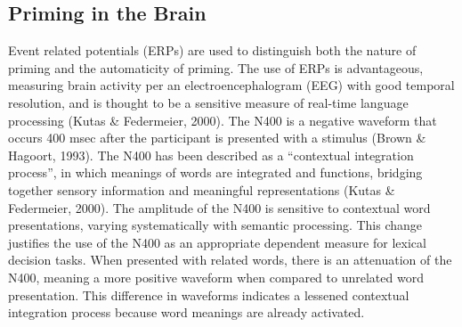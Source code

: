 \documentclass[english,man]{apa6}
\theoremstyle{definition}
\theoremstyle{definition}
\theoremstyle{definition}
\theoremstyle{remark}
\begin{document}
\subsection{Priming in the Brain}\label{priming-in-the-brain}

Event related potentials (ERPs) are used to distinguish both the nature
of priming and the automaticity of priming. The use of ERPs is
advantageous, measuring brain activity per an electroencephalogram (EEG)
with good temporal resolution, and is thought to be a sensitive measure
of real-time language processing (Kutas \& Federmeier, 2000). The N400
is a negative waveform that occurs 400 msec after the participant is
presented with a stimulus (Brown \& Hagoort, 1993). The N400 has been
described as a \enquote{contextual integration process}, in which
meanings of words are integrated and functions, bridging together
sensory information and meaningful representations (Kutas \& Federmeier,
2000). The amplitude of the N400 is sensitive to contextual word
presentations, varying systematically with semantic processing. This
change justifies the use of the N400 as an appropriate dependent measure
for lexical decision tasks. When presented with related words, there is
an attenuation of the N400, meaning a more positive waveform when
compared to unrelated word presentation. This difference in waveforms
indicates a lessened contextual integration process because word
meanings are already activated.
\end{document}
